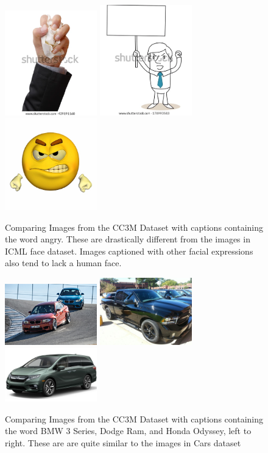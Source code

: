 \documentclass{article} %
\theoremstyle{plain}
\theoremstyle{definition}
\theoremstyle{remark}
\begin{document}
\begin{figure}[!h]
    \centering\includegraphics[width=4cm]{angry1.png} \hfill
    \includegraphics[width=4cm]{angry2.png} \hfill
    \includegraphics[width=4cm]{angry3.png}
    \caption{Comparing Images from the CC3M Dataset with captions containing the word angry. These are drastically different from the images in ICML face dataset. Images captioned with other facial expressions also tend to lack a human face.}
    \label{angry}
\end{figure}


\begin{figure}[!h]
    \centering\includegraphics[width=4cm]{bmw.png} \hfill
    \includegraphics[width=4cm]{dodge.png} \hfill
    \includegraphics[width=4cm]{honda.png}
    \caption{Comparing Images from the CC3M Dataset with captions containing the word BMW 3 Series, Dodge Ram, and Honda Odyssey, left to right. These are are quite similar to the images in Cars dataset}
    \label{car}
\end{figure}
\end{document}
